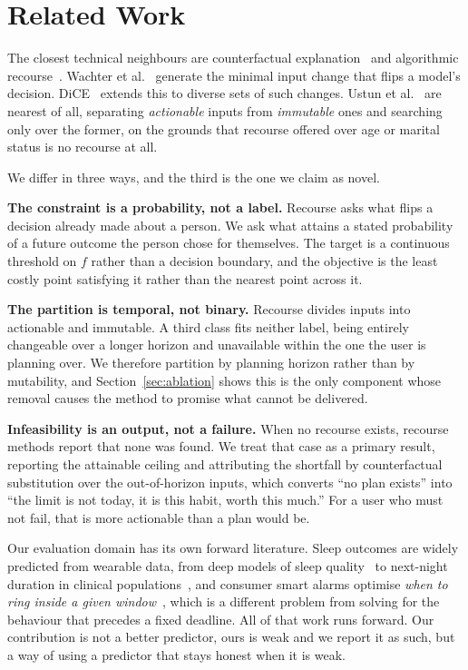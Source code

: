\documentclass[conference,letterpaper]{IEEEtran}
\begin{document}
\section{Related Work}
\label{sec:related}

The closest technical neighbours are counterfactual explanation~\cite{wachter}
and algorithmic recourse~\cite{ustun,dice}. Wachter et al.~\cite{wachter}
generate the minimal input change that flips a model's decision.
DiCE~\cite{dice} extends this to diverse sets of such changes. Ustun et
al.~\cite{ustun} are nearest of all, separating \emph{actionable} inputs from
\emph{immutable} ones and searching only over the former, on the grounds that
recourse offered over age or marital status is no recourse at all.

We differ in three ways, and the third is the one we claim as novel.

\textbf{The constraint is a probability, not a label.} Recourse asks what flips
a decision already made about a person. We ask what attains a stated probability
of a future outcome the person chose for themselves. The target is a continuous
threshold on $f$ rather than a decision boundary, and the objective is the least
costly point satisfying it rather than the nearest point across it.

\textbf{The partition is temporal, not binary.} Recourse divides inputs into
actionable and immutable. A third class fits neither label, being entirely
changeable over a longer horizon and unavailable within the one the user is
planning over. We therefore partition by planning horizon rather than by
mutability, and Section~\ref{sec:ablation} shows this is the only component
whose removal causes the method to promise what cannot be delivered.

\textbf{Infeasibility is an output, not a failure.} When no recourse exists,
recourse methods report that none was found. We treat that case as a primary
result, reporting the attainable ceiling and attributing the shortfall by
counterfactual substitution over the out-of-horizon inputs, which converts ``no
plan exists'' into ``the limit is not today, it is this habit, worth this much.''
For a user who must not fail, that is more actionable than a plan would be.

Our evaluation domain has its own forward literature. Sleep outcomes are widely
predicted from wearable data, from deep models of sleep
quality~\cite{sathya} to next-night duration in clinical
populations~\cite{fellger}, and consumer smart alarms optimise \emph{when to
ring inside a given window}~\cite{smartalarm}, which is a different problem from
solving for the behaviour that precedes a fixed deadline. All of that work runs
forward. Our contribution is not a better predictor, ours is weak and we report
it as such, but a way of using a predictor that stays honest when it is weak.
\end{document}
